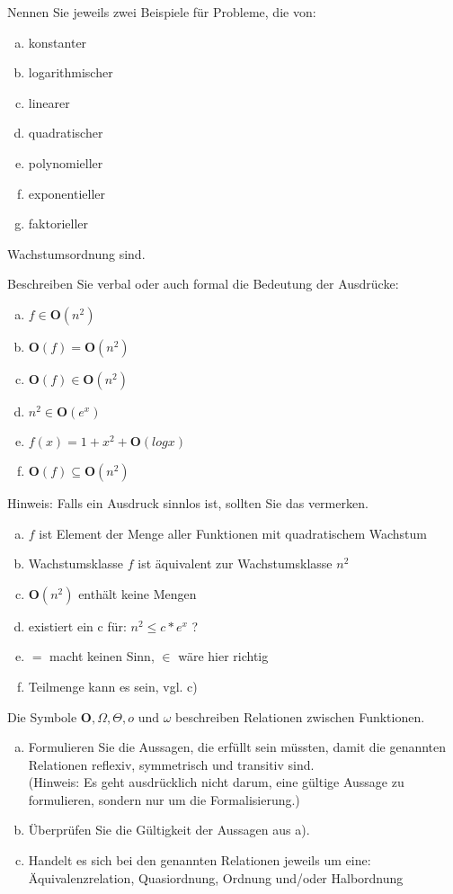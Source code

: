 \begin{card}
	Nennen Sie jeweils zwei Beispiele für Probleme, die von:
	\begin{enumerate}[a)]
	\item konstanter
	\item logarithmischer
	\item linearer
	\item quadratischer
	\item polynomieller
	\item exponentieller
	\item faktorieller 
	\end{enumerate}
	Wachstumsordnung sind.
	\hr
\end{card}

\begin{card}
	Beschreiben Sie verbal oder auch formal die Bedeutung der Ausdrücke: 
	\begin{enumerate}[a)]
	\item $f \in \mathbf{O}(n^2)$
	\item $\mathbf{O}(f) = \mathbf{O}(n^2)$
	\item $\mathbf{O}(f) \in \mathbf{O}(n^2)$
	\item $n^2 \in \mathbf{O}(e^x)$
	\item $f(x) = 1+x^2+\mathbf{O}(log x)$
	\item $\mathbf{O}(f) \subseteq \mathbf{O}(n^2)$
	\end{enumerate}
	Hinweis: Falls ein Ausdruck sinnlos ist, sollten Sie das vermerken.
	\hr
	\begin{enumerate}[a)]
	\item $f$ ist Element der Menge aller Funktionen mit quadratischem Wachstum
	\item Wachstumsklasse $f$ ist äquivalent zur Wachstumsklasse $n^2$
	\item \lightning  $\mathbf{O}(n^2)$ enthält keine Mengen
	\item existiert ein c für: $n^2 \leq c * e^x$ ?
	\item $=$ macht keinen Sinn, $\in$ wäre hier richtig
	\item Teilmenge kann es sein, vgl. c)
	\end{enumerate}
\end{card}

\begin{card}
	Die Symbole $\mathbf{O}, \Omega, \Theta,o \text{ und } \omega$ beschreiben Relationen zwischen Funktionen.
	\begin{enumerate}[a)]
	\item Formulieren Sie die Aussagen, die erfüllt sein müssten, damit die genannten Relationen reflexiv, symmetrisch und transitiv sind.\\
	(Hinweis: Es geht ausdrücklich nicht darum, eine gültige Aussage zu formulieren,
	sondern nur um die Formalisierung.)
	\item Überprüfen Sie die Gültigkeit der Aussagen aus a). 
	\item Handelt es sich bei den genannten Relationen jeweils um eine:
	Äquivalenzrelation, Quasiordnung, Ordnung und/oder Halbordnung 
	\end{enumerate}
\end{card}